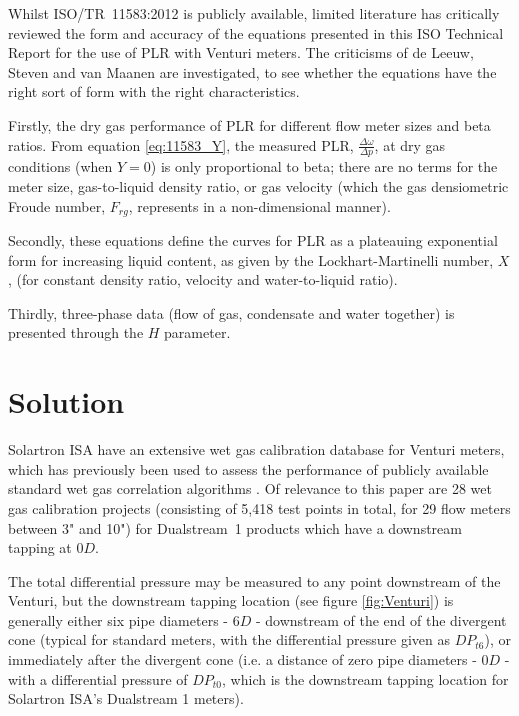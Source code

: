 \documentclass[journal]{IEEEtran}
\begin{document}
Whilst ISO/TR~11583:2012 is publicly available, limited literature has critically reviewed the form and accuracy of the equations presented in this ISO Technical Report for the use of \acrlong{PLR} with Venturi meters.  The criticisms of de Leeuw, Steven and van Maanen \cite{DeLeeuw2011} are investigated, to see whether the equations have the right sort of form with the right characteristics.

Firstly, the dry gas performance of \acrshort{PLR} for different flow meter sizes and beta ratios. From equation \ref{eq:11583_Y}, the measured \acrshort{PLR}, $\frac{\Delta \omega}{\Delta p}$, at dry gas conditions (when $Y=0$) is only proportional to beta; there are no terms for the meter size, gas-to-liquid density ratio, or gas velocity (which the gas densiometric Froude number, $F_{rg}$, represents in a non-dimensional manner).

Secondly, these equations define the curves for \acrshort{PLR} as a plateauing exponential form for increasing liquid content, as given by the Lockhart-Martinelli number, $X$, (for constant density ratio, velocity and water-to-liquid ratio).
  
Thirdly, three-phase data (flow of gas, condensate and water together) is presented through the $H$ parameter. 


\section{Solution}

Solartron ISA have an extensive wet gas calibration database for Venturi meters, which has previously been used to assess the performance of publicly available standard wet gas correlation algorithms \cite{Collins2015}.  Of relevance to this paper are 28 wet gas calibration projects (consisting of 5,418 test points in total, for 29 flow meters between 3" and 10") for Dualstream~1 products which have a downstream tapping at $0D$.

The total differential pressure may be measured to any point downstream of the Venturi, but the downstream tapping location (see figure \ref{fig:Venturi}) is generally either six pipe diameters - $6D$ - downstream of the end of the divergent cone (typical for standard meters, with the differential pressure given as $DP_{t6}$), or immediately after the divergent cone (i.e. a distance of zero pipe diameters - $0D$ - with a differential pressure of $DP_{t0}$, which is the downstream tapping location for Solartron ISA's Dualstream 1 meters).
\end{document}
